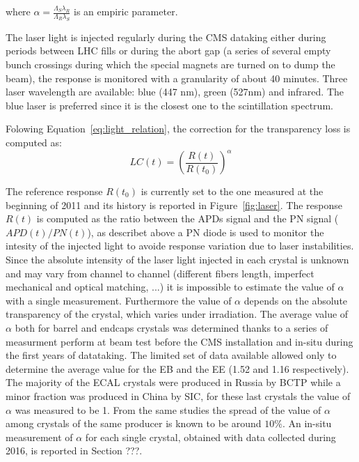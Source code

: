 where $\alpha = \frac{\Lambda_S \lambda_R}{\Lambda_R \lambda_S}$ is an empiric parameter.

The laser light is injected regularly during the CMS dataking either during periods between LHC fills or
during the abort gap (a series of several empty bunch crossings during which the special magnets 
are turned on to dump the beam), the response is monitored with a granularity of about 40 minutes.
Three laser wavelength are available: blue (447 nm), green (527nm) and infrared. The blue laser is
preferred since it is the closest one to the scintillation spectrum.

Folowing Equation~\ref{eq:light_relation}, the correction for the transparency loss is computed as:
\[
  LC(t) = \left(\frac{R(t)}{R(t_0)}\right)^{\alpha}
\]

The reference response $R(t_0)$  is currently set to the one measured at the beginning of 2011 and its history is
reported in Figure~\ref{fig:laser}.
The response $R(t)$ is computed as the ratio between the APDs signal and the PN signal ($APD(t)/PN(t)$), as describet above
a PN diode is used to monitor the intesity of the injected light to avoide response variation due to laser instabilities.
Since the absolute intensity of the laser light injected in each crystal is unknown and may vary from channel to channel
(different fibers length, imperfect mechanical and optical matching, ...) it is impossible to estimate the value of $\alpha$
with a single measurement. Furthermore the value of $\alpha$ depends on the absolute transparency of the crystal, which
varies under irradiation.
The average value of $\alpha$ both for barrel and endcaps crystals was determined thanks to a series of measurment perform
at beam test before the CMS installation and in-situ during the first years of datataking. The limited set of data available
allowed only to determine the average value for the EB and the EE (1.52 and 1.16 respectively).
The majority of the ECAL crystals were produced in
Russia by BCTP while a minor fraction was produced in China by SIC, for these last crystals the value of $\alpha$ was
measured to be 1. From the same studies the spread of the value of $\alpha$ among crystals of the same producer
is known to be around $10\%$. 
An in-situ measurement of $\alpha$ for each single crystal, obtained with data collected during 2016, is reported in Section ???.

